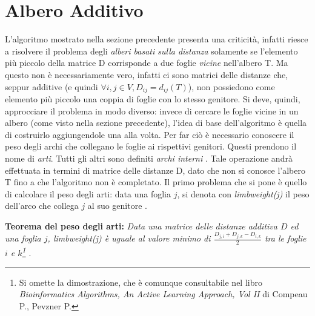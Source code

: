 \section{Albero Additivo}
L'algoritmo mostrato nella sezione precedente presenta una criticità, infatti riesce a risolvere il problema degli \textit{alberi basati sulla distanza} solamente se l'elemento più piccolo della matrice D corrisponde a due foglie \textit{vicine} nell'albero T. Ma questo non è necessariamente vero, infatti ci sono matrici delle distanze che, seppur additive (e quindi $ \forall i,j\in V,D_{ij}=d_{ij}(T)$), non possiedono come elemento più piccolo una coppia di foglie con lo stesso genitore. Si deve, quindi, approcciare il problema in modo diverso: invece di cercare le foglie vicine in un albero (come visto nella sezione precedente), l'idea di base dell'algoritmo è quella di costruirlo aggiungendole una alla volta. Per far ciò è necessario conoscere il peso degli archi che collegano le foglie ai rispettivi genitori. Questi prendono il nome di \textit{arti}. Tutti gli altri sono definiti \textit{archi interni} \cite{cambridgeBioInf}. Tale operazione andrà effettuata in termini di matrice delle distanze D, dato che non si conosce l'albero T fino a che l'algoritmo non è completato.
\newline
Il primo problema che si pone è quello di calcolare il peso degli arti: data una foglia $j$, si denota con \textit{limbweight(j)} il peso dell'arco che collega $j$ al suo genitore \cite{bioinfvideoAdditive}.

\begin{center}
\textbf{Teorema del peso degli arti:}
\newline
\textit{Data una matrice delle distanze additiva $D$ ed una foglia $j$, \textit{limbweight(j)} è uguale al valore minimo di $\frac{D_{j,i}+D_{j,k}-D_{i,k}}{2}$ tra le foglie $i$ e $k$\footnote{Si omette la dimostrazione, che è comunque consultabile nel libro \textit{Bioinformatics Algorithms, An Active Learning Approach, Vol II} di Compeau P., Pevzner P.} \cite{bioinfalganactivelearningapproachparttwo}} .
\end{center}

